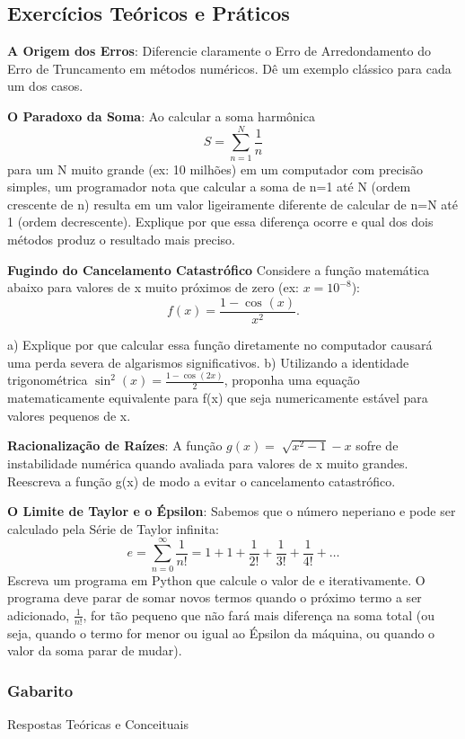 \documentclass[../numerical_methods.tex]{subfiles}
\begin{document}
\subsection{Exercícios Teóricos e Práticos}

\textbf{A Origem dos Erros}: Diferencie claramente o Erro de Arredondamento do Erro de Truncamento em métodos numéricos. Dê um exemplo clássico para cada um dos casos.

\textbf{O Paradoxo da Soma}: Ao calcular a soma harmônica
\[
	S = \sum\limits_{n=1}^{N}\frac{1}{n}
\]
para um N muito grande (ex: 10 milhões) em um computador com precisão simples, um programador nota que calcular a soma de n=1 até N (ordem crescente de n) resulta em um valor ligeiramente diferente de calcular de n=N até 1 (ordem decrescente). Explique por que essa diferença ocorre e qual dos dois métodos produz o resultado mais preciso.

\textbf{Fugindo do Cancelamento Catastrófico} Considere a função matemática abaixo para valores de x muito próximos de zero (ex: \(x=10^{-8}\)):
\[
	f(x) = \frac{1-\cos^{}{(x)}}{x^{2}}.
\]

a) Explique por que calcular essa função diretamente no computador causará uma perda severa de algarismos significativos.
b) Utilizando a identidade trigonométrica \(\displaystyle \sin^{2}{(x)} = \frac{1-\cos^{}{(2x)}}{2}\), proponha uma equação matematicamente equivalente para f(x) que seja numericamente estável para valores pequenos de x.

\textbf{Racionalização de Raízes}: A função \(g(x) = \sqrt[]{x^{2}-1}-x\) sofre de instabilidade numérica quando avaliada para valores de x muito grandes. Reescreva a função g(x) de modo a evitar o cancelamento catastrófico.

\textbf{O Limite de Taylor e o Épsilon}: Sabemos que o número neperiano e pode ser calculado pela Série de Taylor infinita:
\[
	e = \sum\limits_{n=0}^{\infty}\frac{1}{n!} = 1 + 1 + \frac{1}{2!} + \frac{1}{3!}+\frac{1}{4!} + \dotsc
\]
Escreva um programa em Python que calcule o valor de e iterativamente. O programa deve parar de somar novos termos quando o próximo termo a ser adicionado, \(\frac{1}{n!}\), for tão pequeno que não fará mais diferença na soma total (ou seja, quando o termo for menor ou igual ao Épsilon da máquina, ou quando o valor da soma parar de mudar).

\subsubsection{Gabarito}
Respostas Teóricas e Conceituais
\end{document}
